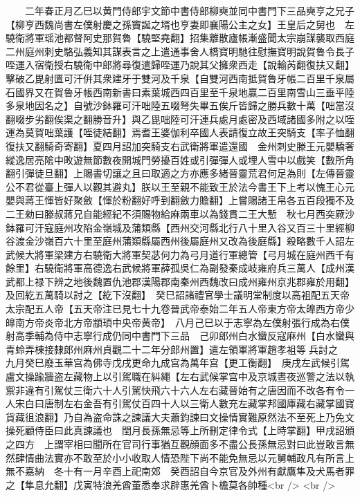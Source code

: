 　　二年春正月乙巳以黄門侍郎宇文節中書侍郎柳奭並同中書門下三品奭亨之兄子【柳亨西魏尚書左僕射慶之孫竇誕之壻也亨妻即襄陽公主之女】王皇后之舅也　左驍衛將軍瑶池都督阿史那賀魯【驍堅堯翻】招集離散廬帳漸盛聞太宗崩謀襲取西庭二州庭州刺史駱弘義知其謀表言之上遣通事舍人橋寶明馳往慰撫寶明說賀魯令長子咥運入宿衛授右驍衛中郎將尋復遣歸咥運乃說其父擁衆西走【說輸芮翻復扶又翻】擊破乙毘射匱可汗倂其衆建牙于雙河及千泉【自雙河西南抵賀魯牙帳二百里千泉屬石國界又在賀魯牙帳西南新書曰素葉城西四百里至千泉地贏二百里南雪山三垂平陸多泉地因名之】自號沙鉢羅可汗咄陸五啜弩失畢五俟斤皆歸之勝兵數十萬【咄當沒翻啜步劣翻俟渠之翻勝音升】與乙毘咄陸可汗連兵處月處密及西域諸國多附之以咥運為莫賀咄葉護【咥徒結翻】焉耆王婆伽利卒國人表請復立故王突騎支【率子恤翻復扶又翻騎奇寄翻】夏四月詔加突騎支右武衛將軍遣還國　金州刺史滕王元嬰驕奢縱逸居亮隂中畋遊無節數夜開城門勞擾百姓或引彈彈人或埋人雪中以戲笑【數所角翻引彈徒旦翻】上賜書切讓之且曰取適之方亦應多緒晉靈荒君何足為則【左傳晉靈公不君從臺上彈人以觀其避丸】朕以王至親不能致王於法今書王下上考以愧王心元嬰與蔣王惲皆好聚斂【惲於粉翻好呼到翻斂力贍翻】上嘗賜諸王帛各五百段獨不及二王勑曰滕叔蔣兄自能經紀不須賜物給麻兩車以為錢貫二王大慙　秋七月西突厥沙鉢羅可汗寇庭州攻陷金嶺城及蒲類縣【西州交河縣北行八十里入谷又百三十里經柳谷渡金沙嶺百六十里至庭州蒲類縣屬西州後屬庭州又改為後庭縣】殺略數千人詔左武候大將軍梁建方右驍衛大將軍契苾何力為弓月道行軍總管【弓月城在庭州西千有餘里】右驍衛將軍高德逸右武候將軍薛孤吳仁為副發秦成岐雍府兵三萬人【成州漢武都上禄下辨之地後魏置仇池郡漢陽郡南秦州西魏改曰成州雍州京兆郡雍於用翻】及回紇五萬騎以討之【紇下沒翻】　癸巳詔諸禮官學士議明堂制度以高袓配五天帝太宗配五人帝【五天帝注已見七十九卷晉武帝泰始二年五人帝東方帝太皥西方帝少皥南方帝炎帝北方帝顓頊中央帝黄帝】　八月己巳以于志寧為左僕射張行成為右僕射高季輔為侍中志寧行成仍同中書門下三品　己卯郎州白水蠻反寇麻州【白水蠻與青蛉弄棟接隸郎州麻州貞觀二十二年分郎州置】遣左領軍將軍趙孝袓等兵討之　九月癸巳廢玉華宫為佛寺戊戌更命九成宫為萬年宫【更工衡翻】　庚戌左武候引駕盧文操踰牆盗左藏物上以引駕職在糾繩【左右武候掌宫中及京城晝夜巡警之法以執禦非違有引駕仗三衛六十人引駕快飛六十六人左右藏晉始有之唐因而不改各有令一人宋白曰唐制左右金吾有引駕仗百四十人以三衛人數充左藏掌邦國庫藏右藏掌國寶貨藏徂浪翻】乃自為盗命誅之諫議大夫蕭鈞諫曰文操情實難原然法不至死上乃免文操死顧侍臣曰此真諫議也　閏月長孫無忌等上所刪定律令式【上時掌翻】甲戌詔頒之四方　上謂宰相曰聞所在官司行事猶互觀顔面多不盡公長孫無忌對曰此豈敢言無然肆情曲法實亦不敢至於小小收取人情恐陛下尚不能免無忌以元舅輔政凡有所言上無不嘉納　冬十有一月辛酉上祀南郊　癸酉詔自今京官及外州有獻鷹隼及犬馬者罪之【隼息允翻】戊寅特浪羌酋董悉奉求辟惠羌酋卜檐莫各帥種<br />
<br />
